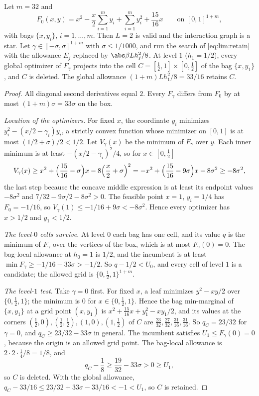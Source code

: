 \begin{proposition}\label{prop:lim:local}
Let $m=32$ and
\[
 F_0(x,y)=x^2-\frac x2\sum_{i=1}^my_i+\sum_{i=1}^my_i^2+\frac{15}{16}x
 \qquad\text{on }[0,1]^{1+m},
\]
with bags $\{x,y_i\}$, $i=1,\ldots,m$. Then $L=2$ is valid and the
interaction graph is a star. Let $\gamma\in[-\sigma,\sigma]^{1+m}$ with
$\sigma\le1/1000$, and run the search of \eqref{eq:lim:retain} with the
allowance $E_j$ replaced by $\abs\beta Lh_j^2/8$. At level $1$ ($h_1=1/2$),
every global optimizer of $F_\gamma$ projects into the cell
$C=[\frac12,1]\times[0,\frac12]$ of the bag $\{x,y_1\}$, and $C$ is deleted.
The global allowance $(1+m)Lh_1^2/8=33/16$ retains $C$.
\end{proposition}

\begin{proof}
All diagonal second derivatives equal $2$. Every $F_\gamma$ differs from
$F_0$ by at most $(1+m)\sigma=33\sigma$ on the box.

\emph{Location of the optimizers.} For fixed $x$, the coordinate $y_i$
minimizes $y_i^2-(x/2-\gamma_i)y_i$, a strictly convex function whose
minimizer on $[0,1]$ is at most $(1/2+\sigma)/2<1/2$. Let $V_\gamma(x)$ be
the minimum of $F_\gamma$ over $y$. Each inner minimum is at least
$-(x/2-\gamma_i)^2/4$, so for $x\in[0,\frac12]$
\[
 V_\gamma(x)\ge x^2+\Bigl(\frac{15}{16}-\sigma\Bigr)x-8\Bigl(\frac x2+\sigma\Bigr)^2
 =-x^2+\Bigl(\frac{15}{16}-9\sigma\Bigr)x-8\sigma^2\ge-8\sigma^2,
\]
the last step because the concave middle expression is at least its
endpoint values $-8\sigma^2$ and $7/32-9\sigma/2-8\sigma^2>0$. The feasible
point $x=1$, $y_i=1/4$ has $F_0=-1/16$, so $V_\gamma(1)\le-1/16+9\sigma<
-8\sigma^2$. Hence every optimizer has $x>1/2$ and $y_1<1/2$.

\emph{The level-$0$ cells survive.} At level $0$ each bag has one cell, and
its value $q$ is the minimum of $F_\gamma$ over the vertices of the box,
which is at most $F_\gamma(0)=0$. The bag-local allowance at $h_0=1$ is
$1/2$, and the incumbent is at least
$\min F_\gamma\ge-1/16-33\sigma>-1/2$. So $q-1/2<U_0$, and every cell of
level $1$ is a candidate; the allowed grid is $\{0,\frac12,1\}^{1+m}$.

\emph{The level-$1$ test.} Take $\gamma=0$ first. For fixed $x$, a leaf
minimizes $y^2-xy/2$ over $\{0,\frac12,1\}$; the minimum is $0$ for
$x\in\{0,\frac12,1\}$. Hence the bag min-marginal of $\{x,y_1\}$ at a grid
point $(x,y_1)$ is $x^2+\frac{15}{16}x+y_1^2-xy_1/2$, and its values at the
corners $(\frac12,0),(\frac12,\frac12),(1,0),(1,\frac12)$ of $C$ are
$\frac{23}{32},\frac{27}{32},\frac{31}{16},\frac{31}{16}$. So
$q_C=23/32$ for $\gamma=0$, and $q_C\ge23/32-33\sigma$ in general. The
incumbent satisfies $U_1\le F_\gamma(0)=0$, because the origin is an
allowed grid point. The bag-local allowance is $2\cdot2\cdot\frac14/8=1/8$,
and
\[
 q_C-\frac18\ge\frac{19}{32}-33\sigma>0\ge U_1 ,
\]
so $C$ is deleted. With the global allowance, $q_C-33/16\le
23/32+33\sigma-33/16<-1<U_1$, so $C$ is retained.
\end{proof}

